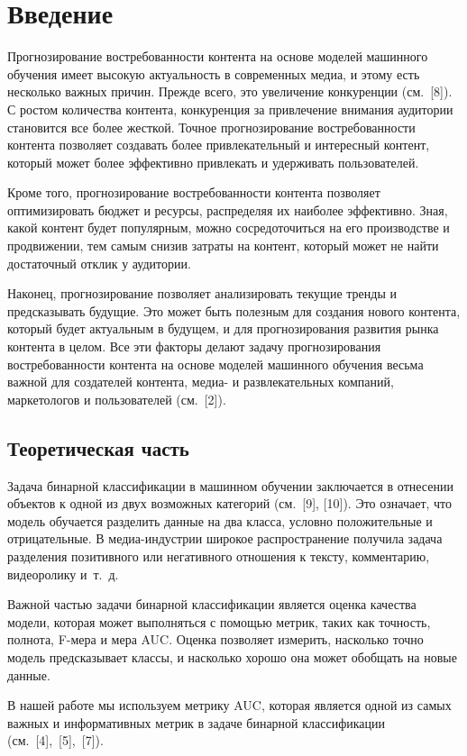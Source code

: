 \section{Введение}
Прогнозирование востребованности контента на основе моделей машинного обучения имеет высокую актуальность в современных медиа, и этому  есть несколько важных причин.
Прежде всего, это увеличение конкуренции (см. [8]). С ростом количества контента, конкуренция за привлечение внимания аудитории становится все более жесткой. Точное прогнозирование востребованности контента позволяет создавать более привлекательный и интересный контент, который может более эффективно привлекать и удерживать пользователей.

Кроме того, прогнозирование востребованности контента позволяет оптимизировать бюджет и ресурсы, распределяя их наиболее эффективно. Зная, какой контент будет популярным, можно сосредоточиться на его производстве и продвижении, тем самым снизив затраты на контент, который может не найти достаточный отклик у аудитории.

Наконец, прогнозирование позволяет анализировать текущие тренды и предсказывать будущие. Это может быть полезным для создания нового контента, который будет актуальным в будущем, и для прогнозирования развития рынка контента в целом.
Все эти факторы делают задачу прогнозирования востребованности контента на основе моделей машинного обучения весьма важной для создателей контента, медиа- и развлекательных компаний, маркетологов и пользователей (см. [2]). 

\subsection{Теоретическая часть}
Задача бинарной классификации в машинном обучении заключается в отнесении объектов к одной из двух возможных категорий (см. [9], [10]). Это означает, что модель обучается разделить данные на два класса, условно положительные и отрицательные. В медиа-индустрии широкое распространение получила задача разделения позитивного или негативного отношения к тексту, комментарию, видеоролику и~т.~д. 

Важной частью задачи бинарной классификации является оценка качества модели, которая может выполняться с помощью метрик, таких как точность, полнота, F-мера и мера AUC. Оценка позволяет измерить, насколько точно модель предсказывает классы, и насколько хорошо она может обобщать на новые данные. 

В нашей работе мы используем метрику AUC, которая является одной из самых важных и информативных метрик в задаче бинарной классификации (см. [4], [5], [7]). 


